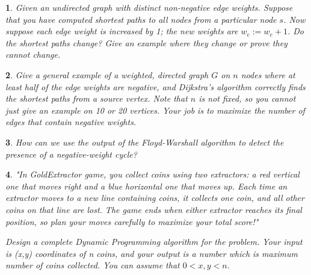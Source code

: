 \documentclass[%
addpoints]{exam}
\theoremstyle{problem}
\newtheorem{p}{}
\begin{document}
\begin{center}
\end{center}

\begin{center}
\end{center}

\begin{p}
Given an undirected graph with distinct non-negative edge weights. Suppose that you have computed shortest paths to all nodes from a particular node \( s \). Now suppose each edge weight is increased by 1; the new weights are \( w_e := w_e + 1 \). Do the shortest paths change? Give an example where they change or prove they cannot change.
\hfill \end{p}

\begin{p} 
Give a general example of a weighted, directed graph \( G \) on \( n \) nodes where at least half of the edge weights are negative, and Dijkstra's algorithm correctly finds the shortest paths from a source vertex. Note that \( n \) is not fixed, so you cannot just give an example on 10 or 20 vertices. Your job is to maximize the number of edges that contain negative weights.
\hfill \end{p}

\begin{p}
How can we use the output of the Floyd-Warshall algorithm to detect the presence of a negative-weight cycle?
\hfill \end{p}

\begin{p}
"In GoldExtractor game, you collect coins using two extractors: a red vertical one that moves right and a blue horizontal one that moves up. Each time an extractor moves to a new line containing coins, it collects one coin, and all other coins on that line are lost. The game ends when either extractor reaches its final position, so plan your moves carefully to maximize your total score!"

Design a complete Dynamic Programming algorithm for the problem. Your input is (x,y) coordinates of n coins, and your output is a number which is maximum number of coins collected. You can assume that $0 < x,y < n$.
\hfill \end{p}
\end{document}

